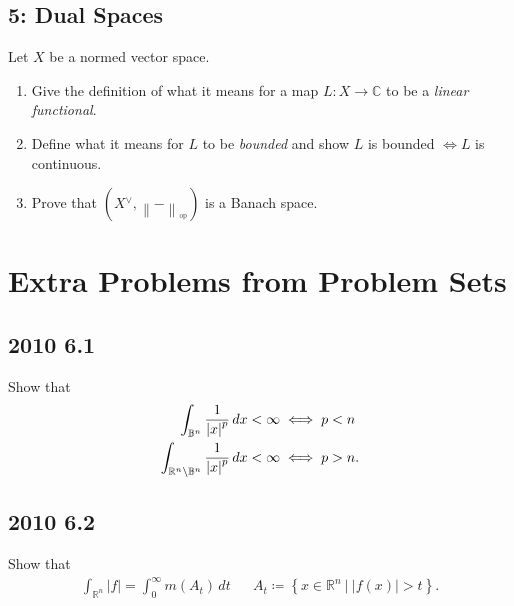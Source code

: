 \hypertarget{dual-spaces}{%
\subsection{5: Dual Spaces}\label{dual-spaces}}

Let \(X\) be a normed vector space.

\begin{enumerate}
\def\labelenumi{\alph{enumi}.}
\item
  Give the definition of what it means for a map \(L:X\to {\mathbb{C}}\)
  to be a \emph{linear functional}.
\item
  Define what it means for \(L\) to be \emph{bounded} and show \(L\) is
  bounded \(\iff L\) is continuous.
\item
  Prove that
  \((X {}^{ \vee }, {\left\lVert {{-}} \right\rVert}_{^{\operatorname{op}}})\)
  is a Banach space.
\end{enumerate}

\hypertarget{extra-problems-from-problem-sets}{%
\section{Extra Problems from Problem
Sets}\label{extra-problems-from-problem-sets}}

\hypertarget{section-4}{%
\subsection{2010 6.1}\label{section-4}}

Show that
\begin{align*}
\int_{{\mathbb{B}}^n} {1 \over {\left\lvert {x} \right\rvert}^p } \,dx&< \infty \iff p < n \\
\int_{{\mathbb{R}}^n\setminus{\mathbb{B}}^n} {1 \over {\left\lvert {x} \right\rvert}^p } \,dx&< \infty \iff p > n 
.\end{align*}

\hypertarget{section-5}{%
\subsection{2010 6.2}\label{section-5}}

Show that
\begin{align*}
\int_{{\mathbb{R}}^n} {\left\lvert { f} \right\rvert} = \int_0^{\infty } m(A_t)\,dt&& A_t \coloneqq\left\{{x\in {\mathbb{R}}^n {~\mathrel{\Big|}~}{\left\lvert {f(x)} \right\rvert} > t}\right\}
.\end{align*}

